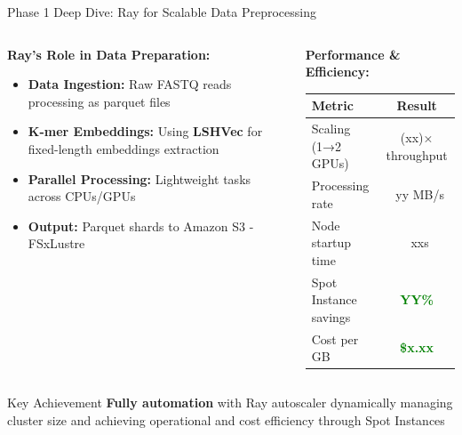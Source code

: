 \documentclass[aspectratio=169]{beamer}
\begin{document}
\begin{frame}{Phase 1 Deep Dive: Ray for Scalable Data Preprocessing}
    \begin{columns}
        \begin{column}{0.5\textwidth}
            \textbf{Ray's Role in Data Preparation:}
            \begin{itemize}
                \item \textbf{Data Ingestion:} Raw FASTQ reads processing as parquet files
                \item \textbf{K-mer Embeddings:} Using \textcolor{rayblue}{\textbf{LSHVec}} for fixed-length embeddings extraction
                \item \textbf{Parallel Processing:} Lightweight tasks across CPUs/GPUs
                \item \textbf{Output:} Parquet shards to Amazon S3 - FSxLustre
            \end{itemize}
        \end{column}
        \begin{column}{0.5\textwidth}
            \textbf{Performance \& Efficiency:}
            \begin{table}[h]
                \centering
                \small
                \begin{tabular}{lc}
                    \toprule
                    \textbf{Metric} & \textbf{Result} \\
                    \midrule
                    Scaling (1→2 GPUs) & (xx)× throughput \\
                    Processing rate & ~yy MB/s \\
                    Node startup time & ~xxs \\
                    Spot Instance savings & \textcolor{green}{\textbf{YY\%}} \\
                    Cost per GB & \textcolor{green}{\textbf{\$x.xx}} \\
                    \bottomrule
                \end{tabular}
            \end{table}
        \end{column}
    \end{columns}
    
    \vspace{0.3cm}
    \begin{block}{Key Achievement}
        \textbf{Fully automation} with Ray autoscaler dynamically managing cluster size and achieving operational and cost efficiency through Spot Instances
    \end{block}
\end{frame}
\end{document}
